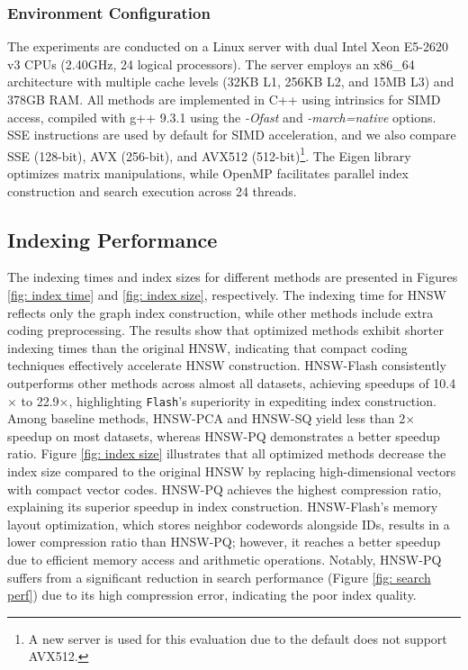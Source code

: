 \subsubsection{\textbf{Environment Configuration}}
The experiments are conducted on a Linux server with dual Intel Xeon E5-2620 v3 CPUs (2.40GHz, 24 logical processors). The server employs an x86\_64 architecture with multiple cache levels (32KB L1, 256KB L2, and 15MB L3) and 378GB RAM. All methods are implemented in C++ using intrinsics for SIMD access, compiled with g++ 9.3.1 using the \textit{-Ofast} and \textit{-march=native} options. {SSE instructions are used by default for SIMD acceleration, and we also compare SSE (128-bit), AVX (256-bit), and AVX512 (512-bit)\footnote{{A new server is used for this evaluation due to the default does not support AVX512.}}.} The Eigen library \cite{eigen} optimizes matrix manipulations, while OpenMP facilitates parallel index construction and search execution across 24 threads.

\subsection{Indexing Performance}
\label{subsec: index perf}
The indexing times and index sizes for different methods are presented in Figures \ref{fig: index time} and \ref{fig: index size}, respectively. The indexing time for HNSW reflects only the graph index construction, while other methods include extra coding preprocessing. The results show that optimized methods exhibit shorter indexing times than the original HNSW, indicating that compact coding techniques effectively accelerate HNSW construction. HNSW-Flash consistently outperforms other methods across almost all datasets, achieving speedups of 10.4$\times$ to 22.9$\times$, highlighting \texttt{Flash}'s superiority in expediting index construction. Among baseline methods, HNSW-PCA and HNSW-SQ yield less than 2$\times$ speedup on most datasets, whereas HNSW-PQ demonstrates a better speedup ratio.
Figure \ref{fig: index size} illustrates that all optimized methods decrease the index size compared to the original HNSW by replacing high-dimensional vectors with compact vector codes. HNSW-PQ achieves the highest compression ratio, explaining its superior speedup in index construction. HNSW-Flash’s memory layout optimization, which stores neighbor codewords alongside IDs, results in a lower compression ratio than HNSW-PQ; however, it reaches a better speedup due to efficient memory access and arithmetic operations. Notably, HNSW-PQ suffers from a significant reduction in search performance (Figure \ref{fig: search perf}) due to its high compression error, indicating the poor index quality.

